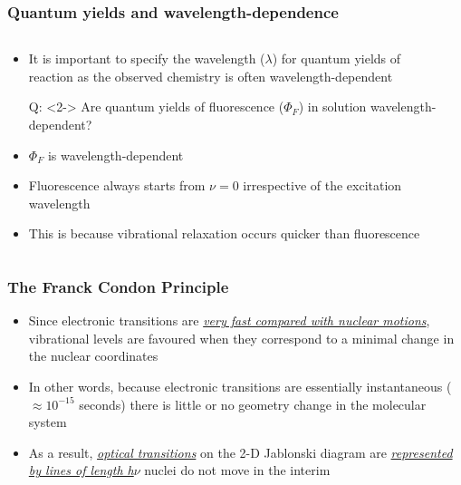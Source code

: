 \documentclass[ignorenonframetext]{beamer}
\begin{document}
\begin{frame}
\frametitle{Quantum yields and wavelength-dependence}
\begin{columns}[T]
\begin{column}{.7\textwidth}
\begin{itemize}
\item<1-> It is important to specify the wavelength (\(\lambda\)) for quantum yields of reaction as the observed chemistry is often wavelength-dependent
\item[Q:]<2-> Are quantum yields of fluorescence (\(\Phi_F\)) in solution wavelength-dependent?
\item<3-> \(\Phi_F\) is wavelength-dependent
\item<4-> Fluorescence always starts from \(\nu = 0\) irrespective of the excitation wavelength
\item<5> This is because vibrational relaxation occurs quicker than fluorescence
\end{itemize}
\end{column}
\begin{column}{.3\textwidth}
\end{column}
\end{columns}
\end{frame}

\begin{frame}[<+->]
\frametitle{The Franck Condon Principle}
\begin{itemize}
\item Since electronic transitions are \textit{\underline{very fast compared with nuclear motions}}, vibrational levels are favoured when they correspond to a minimal change in the nuclear coordinates
\item In other words, because electronic transitions are essentially instantaneous (\(\approx10^{-15}\) seconds) there is little or no geometry change in the molecular system
\item As a result, \textit{\underline{optical transitions}} on the 2-D Jablonski diagram are \newline \textit{\underline{represented by lines of length h\(\nu\)}} \textemdash nuclei do not move in the interim
\end{itemize}
\end{frame}
\end{document}

